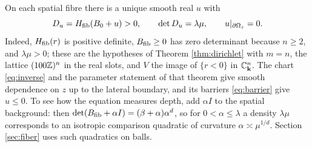 On each spatial fibre there is a unique smooth real $u$ with
\begin{equation}\label{eq:dirichlet}
D_u=H_{\mathrm{fib}}(B_0+u)>0,\qquad\det D_u=\lambda\mu,\qquad u|_{\partial\Omega_z}=0 .
\end{equation}
Indeed, $H_{\mathrm{fib}}(r)$ is positive definite, $B_{\rm fib}\ge0$ has zero determinant because $n\ge2$,
and $\lambda\mu>0$; these are the hypotheses of Theorem \ref{thm:dirichlet} with $m=n$, the lattice
$(100\mathbb{Z})^n$ in the real slots, and $V$ the image of $\{r<0\}$ in $\mathbb{C}_{\mathbf k}^n$. The chart
\eqref{eq:inverse} and the parameter statement of that theorem give smooth dependence on $z$
up to the lateral boundary, and its barriers \eqref{eq:barrier} give $u\le0$. To see how the
equation measures depth, add $\alpha I$ to the spatial background: then
$\det(B_{\rm fib}+\alpha I)=(\beta+\alpha)\alpha^d$, so for $0<\alpha\le\lambda$ a density $\lambda\mu$
corresponds to an isotropic comparison quadratic of curvature $\alpha\asymp\mu^{1/d}$. Section
\ref{sec:fiber} uses such quadratics on balls.

